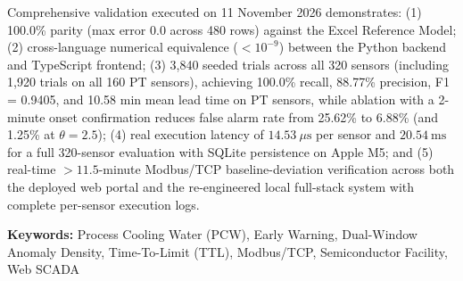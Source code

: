 \documentclass[fontset=none, a4paper, 12pt]{ctexart}
\begin{document}
Comprehensive validation executed on 11 November 2026 demonstrates: (1) 100.0\% parity (max error 0.0 across 480 rows) against the Excel Reference Model; (2) cross-language numerical equivalence ($< 10^{-9}$) between the Python backend and TypeScript frontend; (3) 3,840 seeded trials across all 320 sensors (including 1,920 trials on all 160 PT sensors), achieving 100.0\% recall, 88.77\% precision, F1 = 0.9405, and 10.58 min mean lead time on PT sensors, while ablation with a 2-minute onset confirmation reduces false alarm rate from 25.62\% to 6.88\% (and 1.25\% at $\theta=2.5$); (4) real execution latency of $14.53\ \mu\mathrm{s}$ per sensor and $20.54\ \mathrm{ms}$ for a full 320-sensor evaluation with SQLite persistence on Apple M5; and (5) real-time $>11.5$-minute Modbus/TCP baseline-deviation verification across both the deployed web portal and the re-engineered local full-stack system with complete per-sensor execution logs.

\vspace{1em}
\noindent \textbf{Keywords:} Process Cooling Water (PCW), Early Warning, Dual-Window Anomaly Density, Time-To-Limit (TTL), Modbus/TCP, Semiconductor Facility, Web SCADA

\newpage

{}
\tableofcontents
\newpage

{}
\listoftables
\newpage

{}
\listoffigures
\newpage
\end{document}
